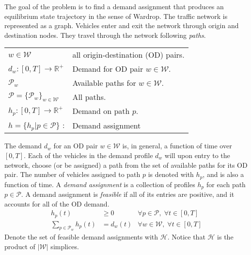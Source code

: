 The goal of the problem is to find a demand assignment that produces an equilibrium state trajectory in the sense of Wardrop\cite{wardrop1952some}. The traffic network  is represented as a graph. Vehicles enter and exit the network through origin and destination nodes. They travel through the network following \textit{paths}. 

\vspace{1em}

\begin{tabular}{ll}
$w\in\mathcal{W}$ & all origin-destination (OD) pairs. \\ 
$d_w : [0,T]\rightarrow \mathbb{R}^+ $  & Demand for OD pair $w\in\mathcal{W}$. \\ 
$\mathcal{P}_w$ & Available paths for $w\in\mathcal{W}$. \\
$\mathcal{P}=\{ \mathcal{P}_w \}_{w\in \mathcal{W}}$ & All paths. \\ 
$h_p : [0,T]\rightarrow \mathbb{R}^+ $ & Demand on path $p$. \\
$h=\{h_p | p\in\mathcal{P}\}$ : & Demand assignment
\end{tabular}

\vspace{1em}

The demand $d_w$ for an OD pair $w\in\mathcal{W}$ is, in general, a function of time over $[0,T]$. Each of the vehicles in the demand profile $d_w$ will upon entry to the network, choose (or be assigned) a path from the set of available paths for its OD pair. The number of vehicles assigned to path $p$ is denoted with $h_p$, and is also a function of time. A \textit{demand assignment} is a collection of profiles $h_p$ for each path $p\in\mathcal{P}$. A demand assignment is \textit{feasible} if all of its entries are positive, and it accounts for all of the OD demand. 
\begin{align}
h_p(t) &\geq 0 & \forall p\in\mathcal{P},\;\forall t\in[0,T] \\
\sum_{p\in \mathcal{P}_w} h_p(t) &= d_w(t) & \forall w\in\mathcal{W}  ,\;\forall t\in[0,T] 
\end{align}
Denote the set of feasible demand assignments with $\mathcal{H}$. Notice that $\mathcal{H}$ is the product of $|\mathcal{W}|$ simplices.

